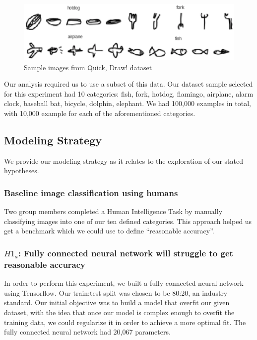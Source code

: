\documentclass[12pt]{article}
\begin{document}
\begin{figure}[h]
  \begin{center}
    \includegraphics[scale=0.5]{fig1}
  \end{center}
  \caption{Sample images from Quick, Draw! dataset}
  \label{fig:quickImages}
\end{figure}

Our analysis required us to use a subset of this data. Our dataset sample
selected for this experiment had 10 categories: fish, fork, hotdog, flamingo,
airplane, alarm clock, baseball bat, bicycle, dolphin, elephant. We had
100,000 examples in total, with 10,000 example for each of the aforementioned
categories.


\subsection{Modeling Strategy}

We provide our modeling strategy as it relates to the exploration of
our stated hypotheses.

\subsubsection{Baseline image classification using humans}

Two group members completed a Human Intelligence Task by manually
classifying images into one of our ten defined categories. This
approach helped us get a benchmark which we could use to
define ``reasonable accuracy''. 

\subsubsection{$H1_a$: Fully connected neural network will struggle
  to get reasonable accuracy}

In order to perform this experiment, we built a fully connected neural network
using Tensorflow. Our train:test split was chosen to be 80:20, an industry
standard. Our initial objective was to build a model that overfit our given
dataset, with the idea that once our model is complex enough to overfit the
training data, we could regularize it in order to achieve a more optimal fit.
The fully connected neural network had 20,067 parameters.
\end{document}
